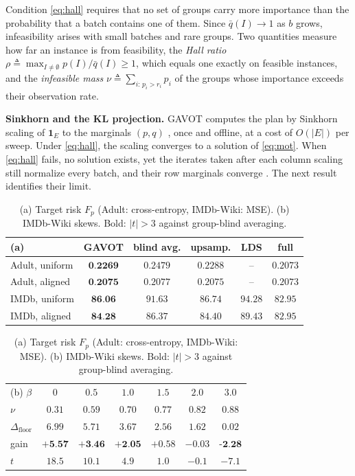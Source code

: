 \documentclass{article}
\theoremstyle{definition}
\newcommand{\avot}{\textsf{GAVOT}}
\newcommand{\best}[1]{\textbf{#1}}
\begin{document}
Condition \eqref{eq:hall} requires that no set of groups carry more
importance than the probability that a batch contains one of them. Since
$\bar q(I)\to1$ as $b$ grows, infeasibility arises with small batches and
rare groups. Two quantities measure how far an instance is from
feasibility, the \emph{Hall ratio}
$\rho\triangleq\max_{I\neq\emptyset}p(I)/\bar q(I)\ge1$, which equals one
exactly on feasible instances, and the \emph{infeasible mass}
$\nu\triangleq\sum_{i:\,p_i>r_i}p_i$ of the groups whose importance
exceeds their observation rate.

\noindent\textbf{Sinkhorn and the KL projection.} \avot{} computes the
plan by Sinkhorn scaling of $\mathbf 1_E$ to the marginals $(p,q)$
\cite{sinkhorn1967,cuturi2013,peyre2019}, once and offline, at a cost of
$O(|E|)$ per sweep. Under \eqref{eq:hall}, the scaling converges to a
solution of \eqref{eq:mot}. When \eqref{eq:hall} fails, no solution
exists, yet the iterates taken after each column scaling still normalize
every batch, and their row marginals converge \cite{gietl2013ipfp}. The
next result identifies their limit.

\begin{table}[tp]
\centering
\small\setlength{\tabcolsep}{3pt}
\begin{tabular}[t]{lccccc}
\toprule
(a) & \avot{} & blind avg. & upsamp. & LDS & full \\
\midrule
Adult, uniform & $\best{0.2269}$ & $0.2479$ & $0.2288$ & -- & $0.2073$ \\
Adult, aligned & $\best{0.2075}$ & $0.2077$ & $0.2075$ & -- & $0.2073$ \\
IMDb, uniform  & $\best{86.06}$ & $91.63$ & $86.74$ & $94.28$ & $82.95$ \\
IMDb, aligned  & $\best{84.28}$ & $86.37$ & $84.40$ & $89.43$ & $82.95$ \\
\bottomrule
\end{tabular}%
\hfill
\setlength{\tabcolsep}{4.2pt}%
\begin{tabular}[t]{lcccccc}
\toprule
(b) $\beta$ & $0$ & $0.5$ & $1.0$ & $1.5$ & $2.0$ & $3.0$ \\
$\nu$ & $0.31$ & $0.59$ & $0.70$ & $0.77$ & $0.82$ & $0.88$ \\
\midrule
$\Delta_{\mathrm{floor}}$ & $6.99$ & $5.71$ & $3.67$ & $2.56$ & $1.62$ & $0.02$ \\
gain & $\best{+5.57}$ & $\best{+3.46}$ & $\best{+2.05}$ & $+0.58$ & $-0.03$ & $\best{-2.28}$ \\
$t$ & $18.5$ & $10.1$ & $4.9$ & $1.0$ & $-0.1$ & $-7.1$ \\
\bottomrule
\end{tabular}
\vspace{-8pt}
\caption{(a) Target risk $F_p$ (Adult: cross-entropy, IMDb-Wiki: MSE).
(b) IMDb-Wiki skews. Bold: $|t|>3$ against group-blind averaging.}
\label{tab:results}
\end{table}
\end{document}
